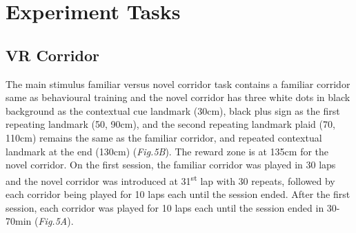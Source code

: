 \section{Experiment Tasks}
\subsection{VR Corridor}
The main stimulus familiar versus novel corridor task contains a familiar corridor same as behavioural training and the novel corridor has three white dots in black background as the contextual cue landmark (30cm), black plus sign as the first repeating landmark (50, 90cm), and the second repeating landmark plaid (70, 110cm) remains the same as the familiar corridor, and repeated contextual landmark at the end (130cm) (\textit{Fig.5B}). The reward zone is at 135cm for the novel corridor. On the first session, the familiar corridor was played in 30 laps and the novel corridor was introduced at 31\textsuperscript{st} lap with 30 repeats, followed by each corridor being played for 10 laps each until the session ended. After the first session, each corridor was played for 10 laps each until the session ended in 30-70min (\textit{Fig.5A}). 

